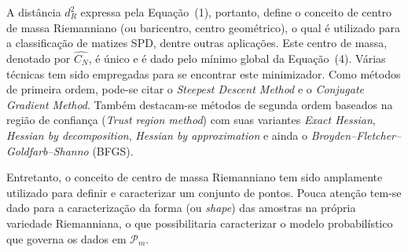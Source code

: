 \documentclass[a4paper,titlepage]{article}
\begin{document}
\begin{center}
  \vspace{1em}
  \vspace{1em}
\end{center}

A distância $d^2_R$ expressa pela Equação~(1), portanto, define o conceito de
centro de massa Riemanniano (ou baricentro, centro geométrico), o qual é utilizado
para a classificação de matizes SPD, dentre outras aplicações. Este centro de
massa, denotado por $\hat{C_N}$, é único e é dado pelo mínimo global da
Equação~(4). Várias técnicas tem sido empregadas para se encontrar este
minimizador. Como métodos de primeira ordem, pode-se citar o \textit{Steepest
Descent Method} e o \textit{Conjugate Gradient Method}. Também destacam-se
métodos de segunda ordem baseados na região de confiança (\textit{Trust region
method}) com suas variantes \textit{Exact Hessian}, \textit{Hessian by
decomposition}, \textit{Hessian by approximation} e ainda o
\textit{Broyden–Fletcher–Goldfarb–Shanno} (BFGS).

Entretanto, o conceito de centro de massa Riemanniano tem sido amplamente
utilizado para definir e caracterizar um conjunto de pontos. Pouca atenção
tem-se dado para a caracterização da forma (ou \textit{shape}) das amostras na
própria variedade Riemanniana, o que possibilitaria caracterizar o modelo
probabilístico que governa os dados em $\mathcal{P}_m$.
\end{document}
